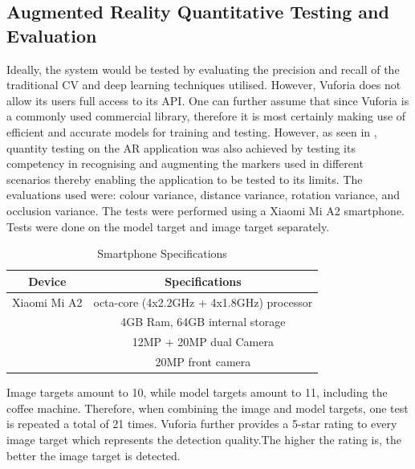 \documentclass{aifyp}
\begin{document}
\subsection{Augmented Reality Quantitative Testing and Evaluation}
Ideally, the system would be tested by evaluating the precision and recall of the traditional CV and deep learning techniques utilised. However, Vuforia does not allow its users full access to its API. One can further assume that since Vuforia is a commonly used commercial library, therefore it is most certainly making use of efficient and accurate models for training and testing. However, as seen in \cite{MobileARQualityEval}, quantity testing on the AR application was also achieved by testing its competency in recognising and augmenting the markers used in different scenarios thereby enabling the application to be tested to its limits. The evaluations used were: colour variance, distance variance, rotation variance, and occlusion variance. The tests were performed using a Xiaomi Mi A2 smartphone. Tests were done on the model target and image target separately.
\begin{table}[H]
\begin{center}
 \begin{tabular}{||c c||} 
 \hline
 \textbf{Device} & \textbf{Specifications} \\ [0.5ex] 
 \hline\hline
 Xiaomi Mi A2 & octa-core (4x2.2GHz + 4x1.8GHz) processor \\&
 4GB Ram, 64GB internal storage \\&
 12MP + 20MP dual Camera\\& 20MP front camera\\ 
  [1ex] 
 \hline
\end{tabular}
\caption{Smartphone Specifications}
\label{tab:SmartphoneSpecifications}
\end{center}
\end{table}
Image targets amount to 10, while model targets amount to 11, including the coffee machine. Therefore, when combining the image and model targets, one test is repeated a total of 21 times. Vuforia further provides a 5-star rating to every image target which represents the detection quality.The higher the rating is, the better the image target is detected. 
\end{document}

